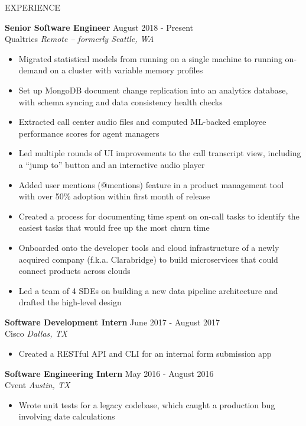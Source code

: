 \documentclass{resume} %
\begin{document}
\begin{rSection}{EXPERIENCE}

\textbf{Senior Software Engineer} \hfill August 2018 - Present\\
Qualtrics \hfill \textit{Remote -- formerly Seattle, WA}
 \begin{itemize}
    \itemsep -3pt {} 
\item Migrated statistical models from running on a single machine to running on-demand on a cluster with variable memory profiles
\item Set up MongoDB document change replication into an analytics database, with schema syncing and data consistency health checks
\item Extracted call center audio files and computed ML-backed employee performance scores for agent managers
\item Led multiple rounds of UI improvements to the call transcript view, including a “jump to” button and an interactive audio player
\item Added user mentions (@mentions) feature in a product management tool with over 50\% adoption within first month of release
\item Created a process for documenting time spent on on-call tasks to identify the easiest tasks that would free up the most churn time
\item Onboarded onto the developer tools and cloud infrastructure of a newly acquired company (f.k.a. Clarabridge) to build microservices that could connect products across clouds
\item Led a team of 4 SDEs on building a new data pipeline architecture and drafted the high-level design
 \end{itemize}
 
\textbf{Software Development Intern} \hfill June 2017 - August 2017\\
Cisco \hfill \textit{Dallas, TX}
 \begin{itemize}
     \item Created a RESTful API and CLI for an internal form submission app
 \end{itemize}
 
 \textbf{Software Engineering Intern} \hfill May 2016 - August 2016\\
Cvent \hfill \textit{Austin, TX}
 \begin{itemize}
     \item Wrote unit tests for a legacy codebase, which caught a production bug involving date calculations
 \end{itemize}

\end{rSection} 

\iffalse
\begin{rSection}{PROJECTS}
\vspace{-1.25em}
\item \textbf{Short Project Title.} {Build a project that does something and had quantified success using A, B, and C. This project's description spans two lines and also won an award.}
\end{rSection} 
\fi
\end{document}
